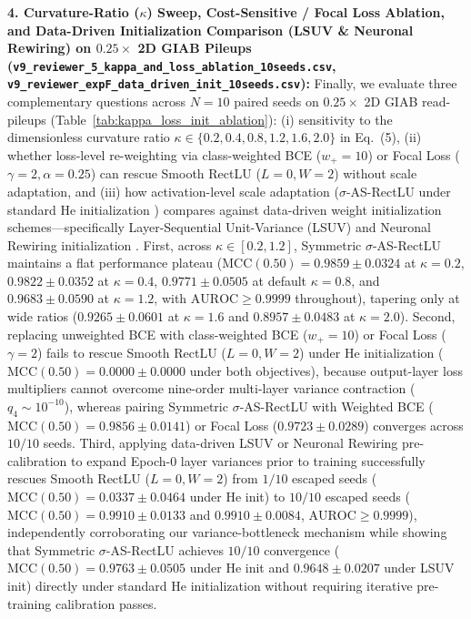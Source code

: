 \documentclass[11pt, a4paper]{article}
\begin{document}
\noindent\textbf{4. Curvature-Ratio ($\kappa$) Sweep, Cost-Sensitive / Focal Loss Ablation, and Data-Driven Initialization Comparison (LSUV \& Neuronal Rewiring) on $0.25\times$ 2D GIAB Pileups (\texttt{v9\_reviewer\_5\_kappa\_and\_loss\_ablation\_10seeds.csv}, \texttt{v9\_reviewer\_expF\_data\_driven\_init\_10seeds.csv}):} Finally, we evaluate three complementary questions across $N = 10$ paired seeds on $0.25\times$ 2D GIAB read-pileups (Table~\ref{tab:kappa_loss_init_ablation}): (i) sensitivity to the dimensionless curvature ratio $\kappa \in \{0.2, 0.4, 0.8, 1.2, 1.6, 2.0\}$ in Eq.~(5), (ii) whether loss-level re-weighting via class-weighted BCE ($w_+ = 10$) or Focal Loss ($\gamma = 2, \alpha = 0.25$) \cite{ref21} can rescue Smooth RectLU ($L=0, W=2$) without scale adaptation, and (iii) how activation-level scale adaptation ($\sigma$-AS-RectLU under standard He initialization \cite{ref26}) compares against data-driven weight initialization schemes---specifically Layer-Sequential Unit-Variance (LSUV) \cite{ref32} and Neuronal Rewiring initialization \cite{ref40}. First, across $\kappa \in [0.2, 1.2]$, Symmetric $\sigma$-AS-RectLU maintains a flat performance plateau ($\mathrm{MCC}(0.50) = 0.9859 \pm 0.0324$ at $\kappa=0.2$, $0.9822 \pm 0.0352$ at $\kappa=0.4$, $0.9771 \pm 0.0505$ at default $\kappa=0.8$, and $0.9683 \pm 0.0590$ at $\kappa=1.2$, with $\mathrm{AUROC} \ge 0.9999$ throughout), tapering only at wide ratios ($0.9265 \pm 0.0601$ at $\kappa=1.6$ and $0.8957 \pm 0.0483$ at $\kappa=2.0$). Second, replacing unweighted BCE with class-weighted BCE ($w_+ = 10$) or Focal Loss ($\gamma = 2$) fails to rescue Smooth RectLU ($L=0, W=2$) under He initialization ($\mathrm{MCC}(0.50) = 0.0000 \pm 0.0000$ under both objectives), because output-layer loss multipliers cannot overcome nine-order multi-layer variance contraction ($q_4 \sim 10^{-10}$), whereas pairing Symmetric $\sigma$-AS-RectLU with Weighted BCE ($\mathrm{MCC}(0.50) = 0.9856 \pm 0.0141$) or Focal Loss ($0.9723 \pm 0.0289$) converges across $10/10$ seeds. Third, applying data-driven LSUV \cite{ref32} or Neuronal Rewiring \cite{ref40} pre-calibration to expand Epoch-0 layer variances prior to training successfully rescues Smooth RectLU ($L=0, W=2$) from $1/10$ escaped seeds ($\mathrm{MCC}(0.50) = 0.0337 \pm 0.0464$ under He init) to $10/10$ escaped seeds ($\mathrm{MCC}(0.50) = 0.9910 \pm 0.0133$ and $0.9910 \pm 0.0084$, $\mathrm{AUROC} \ge 0.9999$), independently corroborating our variance-bottleneck mechanism while showing that Symmetric $\sigma$-AS-RectLU achieves $10/10$ convergence ($\mathrm{MCC}(0.50) = 0.9763 \pm 0.0505$ under He init and $0.9648 \pm 0.0207$ under LSUV init) directly under standard He initialization without requiring iterative pre-training calibration passes.
\end{document}
